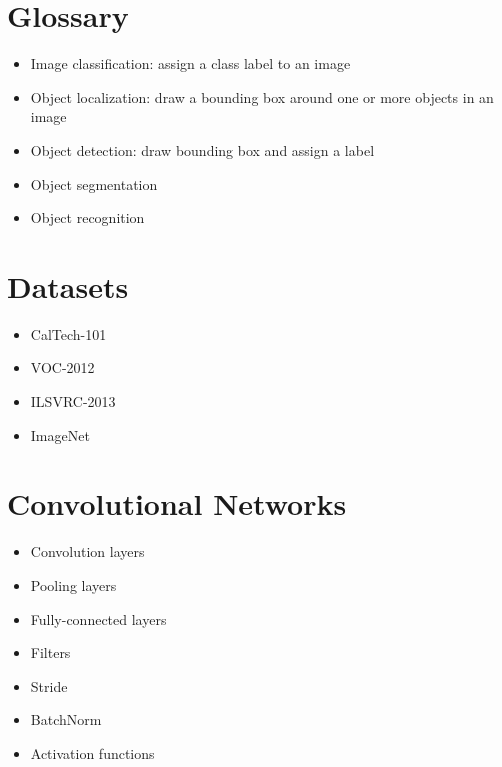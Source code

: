 \documentclass[../main.tex]{subfiles}
\begin{document}
\section{Glossary}
\begin{itemize}
  \item Image classification: assign a class label to an image
  \item Object localization: draw a bounding box around one or more objects in an image
  \item Object detection: draw bounding box and assign a label
  \item Object segmentation
  \item Object recognition
\end{itemize}

\section{Datasets}
\begin{itemize}
  \item CalTech-101
  \item VOC-2012
  \item ILSVRC-2013
  \item ImageNet
\end{itemize}

\section{Convolutional Networks}
\begin{itemize}
  \item Convolution layers
  \item Pooling layers
  \item Fully-connected layers
  \item Filters
  \item Stride
  \item BatchNorm
  \item Activation functions
\end{itemize}
\end{document}
